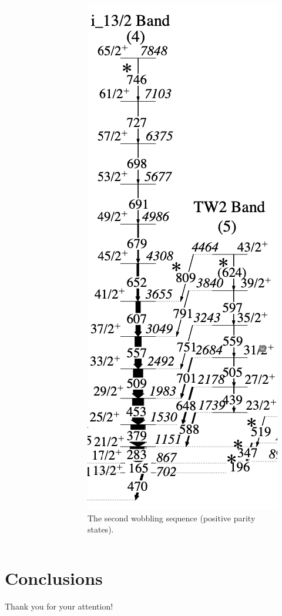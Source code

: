 \documentclass{beamer}
\begin{document}
\begin{frame}
\begin{columns}[c]
\begin{figure}
         \label{au183negative}
     \end{figure}
     \begin{figure}
         \centering
         \includegraphics[scale=0.15]{figs/positive_Au183.png}
         \caption{The second wobbling sequence (positive parity states).}
         \label{au183positive}
     \end{figure}
    \end{columns}
\end{frame}

\section{Conclusions}

  \begin{frame}
  \centering
    \Large{Thank you for your attention!}
  \end{frame}
\end{document}
